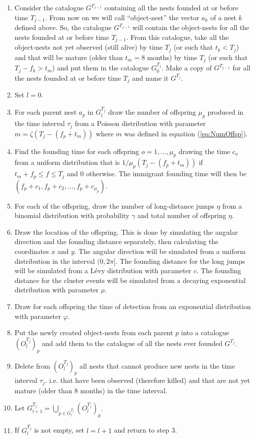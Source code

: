 \documentclass{article}
\begin{document}
\begin{enumerate}
    \item Consider the catalogue $G^{T_{j-1}}$ containing all the nests founded at or before time $T_{j-1}$. From now on we will call ``object-nest'' the vector $a_k$ of a nest $k$ defined above. So, the catalogue $G^{T_{j-1}}$ will contain the object-nests for all the nests founded at or before time $T_{j-1}$. From this catalogue, take all the object-nests not yet observed (still alive) by time $T_j$ (or such that $t_k < T_j$) and that will be mature (older than $t_m = 8$ months) by time $T_j$ (or such that $T_j - f_k > t_m$) and put them in the catalogue $G_0^{T_j}$. Make a copy of $G^{T_{j-1}}$ for all the nests founded at or before time $T_{j}$ and name it $G^{T_{j}}$.
    \item Set $l = 0$.
    \item For each parent nest $a_p$ in $G_l^{T_j}$ draw the number of offspring $\mu_p$ produced in the time interval $\tau_j$ from a Poisson distribution with parameter $ m = \zeta (T_j-(f_p + t_m))$ where $m$ was defined in equation (\ref{eq:NumOffsp}).
    \item Find the founding time for each offspring $o = 1, \dots, \mu_p$ drawing the time $c_o$ from a uniform distribution that is $1/\mu_p(T_j-(f_p + t_m))$ if $t_m + f_p \leq f \leq T_j$ and $0$ otherwise. The immigrant founding time will then be $( f_p + c_1, f_p + c_2, \dots, f_p + c_{\mu_p})$.
    \item For each of the offspring, draw the number of long-distance jumps $\eta$ from a binomial distribution with probability $\gamma$ and total number of offspring $\eta$.
    \item Draw the location of the offspring. This is done by simulating the angular direction and the founding distance separately, then calculating the coordinates $x$ and $y$. The angular direction will be simulated from a uniform distribution in the interval $(0, 2\pi]$. The founding distance for the long jumps will be simulated from a L\'evy distribution with parameter $c$. The founding distance for the cluster events will be simulated from a decaying exponential distribution with parameter $\rho$.
    \item Draw for each offspring the time of detection from an exponential distribution with parameter $\varphi$.
    \item Put the newly created object-nests from each parent $p$ into a catalogue $(O_l^{T_j})_p$ and add them to the catalogue of all the nests ever founded $G^{T_j}$.
    \item Delete from $(O_l^{T_j})_p$ all nests that cannot produce new nests in the time interval $\tau_j$. i.e. that have been observed (therefore killed) and that are not yet mature (older than 8 months) in the time interval.
    \item Let $G_{l+1}^{T_j} = \bigcup_{p\in G_l^{T_j}} (O_l^{T_j})_p$.
    \item If $G_l^{T_j}$ is not empty, set $l = l+1$ and return to step 3.
\end{enumerate}
\end{document}
